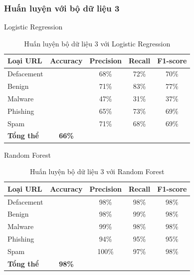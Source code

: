 \documentclass[13pt]{article}
\begin{document}
\subsubsection{Huấn luyện với bộ dữ liệu 3}
Logistic Regression
\newpage
\begin{table}[h]
    \centering
    \renewcommand{\arraystretch}{1.3} %
    \begin{tabular}{|l|c|c|c|c|}
        \hline
        \rowcolor[HTML]{C0C0C0} %
        \textbf{Loại URL} & \textbf{Accuracy} & \textbf{Precision} & \textbf{Recall} & \textbf{F1-score} \\ 
        \hline
        Defacement &  & 68\% & 72\% & 70\% \\ 
        \hline
        Benign &  & 71\% & 83\% & 77\% \\ 
        \hline
        Malware &  & 47\% & 31\% & 37\% \\ 
        \hline
        Phishing &  & 65\% & 73\% & 69\% \\ 
        \hline
        Spam &  & 71\% & 68\% & 69\% \\ 
        \hline
        \textbf{Tổng thể} & \textbf{66\%} &  &  &  \\ 
        \hline
    \end{tabular}
    \caption{Huấn luyện bộ dữ liệu 3 với Logistic Regression}
    \label{tab:logistic_regression}
\end{table}

Random Forest
\begin{table}[h]
    \centering
    \renewcommand{\arraystretch}{1.3} %
    \begin{tabular}{|l|c|c|c|c|}
        \hline
        \rowcolor[HTML]{C0C0C0} %
        \textbf{Loại URL} & \textbf{Accuracy} & \textbf{Precision} & \textbf{Recall} & \textbf{F1-score} \\ 
        \hline
        Defacement &  & 98\% & 98\% & 98\% \\ 
        \hline
        Benign &  & 98\% & 99\% & 98\% \\ 
        \hline
        Malware &  & 99\% & 98\% & 98\% \\ 
        \hline
        Phishing &  & 94\% & 95\% & 95\% \\ 
        \hline
        Spam &  & 100\% & 97\% & 98\% \\ 
        \hline
        \textbf{Tổng thể} & \textbf{98\%} &  &  &  \\ 
        \hline
    \end{tabular}
    \caption{Huấn luyện bộ dữ liệu 3 với Random Forest}
    \label{tab:logistic_regression}
\end{table}
\end{document}
